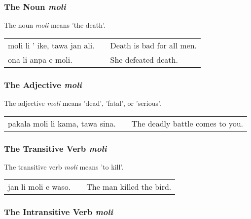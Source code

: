 %
%
\subsubsection*{The Noun \textit{moli}}
%
%

The noun \textit{moli} means 'the death'.

\begin{supertabular}{p{5,5cm}|ll}
moli li ' ike, tawa jan ali. && Death is bad for all men. \\
ona li anpa e moli. && She defeated death.  \\
\end{supertabular} 

%
%
\subsubsection*{The Adjective \textit{moli}}
%
%

The adjective \textit{moli} means 'dead', 'fatal', or 'serious'. 

\begin{supertabular}{p{5,5cm}|ll}
pakala moli li kama, tawa sina. && The deadly battle comes to you. \\
\end{supertabular} 

%
%
\subsubsection*{The Transitive Verb \textit{moli}}
%
%
The transitive verb \textit{moli} means 'to kill'.

\begin{supertabular}{p{5,5cm}|ll}
jan li moli e waso. && The man killed the bird. \\
\end{supertabular} 

%
%
\subsubsection*{The Intransitive Verb \textit{moli}}
%
%

